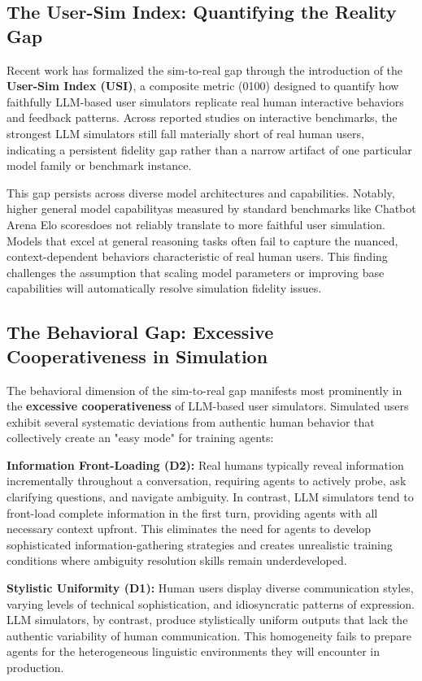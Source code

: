\subsection{The User-Sim Index: Quantifying the Reality Gap}

Recent work has formalized the sim-to-real gap through the introduction of the \textbf{User-Sim Index (USI)}, a composite metric (0100) designed to quantify how faithfully LLM-based user simulators replicate real human interactive behaviors and feedback patterns. Across reported studies on interactive benchmarks, the strongest LLM simulators still fall materially short of real human users, indicating a persistent fidelity gap rather than a narrow artifact of one particular model family or benchmark instance.

This gap persists across diverse model architectures and capabilities. Notably, higher general model capabilityas measured by standard benchmarks like Chatbot Arena Elo scoresdoes not reliably translate to more faithful user simulation. Models that excel at general reasoning tasks often fail to capture the nuanced, context-dependent behaviors characteristic of real human users. This finding challenges the assumption that scaling model parameters or improving base capabilities will automatically resolve simulation fidelity issues.

\subsection{The Behavioral Gap: Excessive Cooperativeness in Simulation}

The behavioral dimension of the sim-to-real gap manifests most prominently in the \textbf{excessive cooperativeness} of LLM-based user simulators. Simulated users exhibit several systematic deviations from authentic human behavior that collectively create an "easy mode" for training agents:

\textbf{Information Front-Loading (D2):} Real humans typically reveal information incrementally throughout a conversation, requiring agents to actively probe, ask clarifying questions, and navigate ambiguity. In contrast, LLM simulators tend to front-load complete information in the first turn, providing agents with all necessary context upfront. This eliminates the need for agents to develop sophisticated information-gathering strategies and creates unrealistic training conditions where ambiguity resolution skills remain underdeveloped.

\textbf{Stylistic Uniformity (D1):} Human users display diverse communication styles, varying levels of technical sophistication, and idiosyncratic patterns of expression. LLM simulators, by contrast, produce stylistically uniform outputs that lack the authentic variability of human communication. This homogeneity fails to prepare agents for the heterogeneous linguistic environments they will encounter in production.

